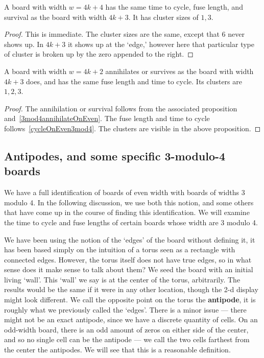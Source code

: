 \documentclass[12pt,letterpaper]{article}
\begin{document}
\begin{cor}\label{4mod4like3mod4}
  A board with width $w=4k+4$ has the same time to cycle, fuse length, and survival as the board with width $4k+3$. It has cluster sizes of $1,3$. 
\end{cor}
\begin{proof}
  This is immediate. The cluster sizes are the same, except that 6 never shows up. In $4k+3$ it shows up at the `edge,' however here that particular type of cluster is broken up by the zero appended to the right.
\end{proof}

\begin{cor}\label{2mod4Characterization}
  A board with width $w=4k+2$ annihilates or survives as the board with width $4k+3$ does, and has the same fuse length and time to cycle. Its clusters are $1,2,3$. 
\end{cor}
\begin{proof}
  The annihilation or survival follows from the associated proposition and~\cref{3mod4annihilateOnEven}. The fuse length and time to cycle follows~\cref{cycleOnEven3mod4}. The clusters are visible in the above proposition.
\end{proof}

\subsection{Antipodes, and some specific 3-modulo-4 boards}
We have a full identification of boards of even width with boards of widths 3 modulo 4. In the following discussion, we use both this notion, and some others that have come up in the course of finding this identification. We will examine the time to cycle and fuse lengths of certain boards whose width are 3 modulo 4.

We have been using the notion of the `edges' of the board without defining it, it has been based simply on the intuition of a torus seen as a rectangle with connected edges. However, the torus itself does not have true edges, so in what sense does it make sense to talk about them? We seed the board with an initial living `wall'. This `wall' we say is at the center of the torus, arbitrarily. The results would be the same if it were in any other location, though the 2-d display might look different. We call the opposite point on the torus the {\bf antipode}, it is roughly what we previously called the `edges'. There is a minor issue --- there might not be an exact antipode, since we have a discrete quantity of cells. On an odd-width board, there is an odd amount of zeros on either side of the center, and so no single cell can be the antipode --- we call the two cells farthest from the center the antipodes. We will see that this is a reasonable definition.
\end{document}

